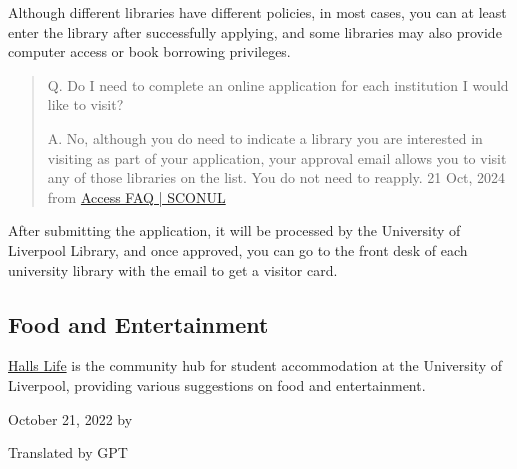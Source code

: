 Although different libraries have different policies, in most cases, you can at least enter the library after successfully applying, and some libraries may also provide computer access or book borrowing privileges.

\begin{quote}
    Q. Do I need to complete an online application for each institution I would like to visit?
    
    A. No, although you do need to indicate a library you are interested in visiting as part of your application, your approval email allows you to visit any of those libraries on the list. You do not need to reapply. \hfill 21 Oct, 2024 from \href{https://access.sconul.ac.uk/page/access-faq#Multiple%20applications}{Access FAQ | SCONUL}
\end{quote}

After submitting the application, it will be processed by the University of Liverpool Library, and once approved, you can go to the front desk of each university library with the email to get a visitor card.

\subsection{Food and Entertainment}
\href{https://hallslife.liverpool.ac.uk}{Halls Life} is the community hub for student accommodation at the University of Liverpool, providing various suggestions on food and entertainment.

\begin{flushright}
    October 21, 2022 by \Shiyao

    Translated by GPT
\end{flushright}
